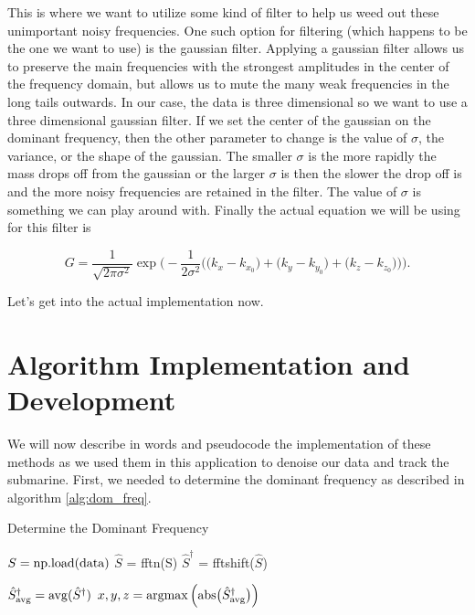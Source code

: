 \documentclass[11pt]{amsart}
\begin{document}
This is where we want to utilize some kind of filter to help us weed out these unimportant noisy frequencies.
One such option for filtering (which happens to be the one we want to use) is the gaussian filter.
Applying a gaussian filter allows us to preserve the main frequencies with the strongest amplitudes in the center of the frequency domain, but allows us to mute the many weak frequencies in the long tails outwards.
In our case, the data is three dimensional so we want to use a three dimensional gaussian filter.
If we set the center of the gaussian on the dominant frequency, then the other parameter to change is the value of $\sigma$, the variance, or the shape of the gaussian.
The smaller $\sigma$ is the more rapidly the mass drops off from the gaussian or the larger $\sigma$ is then the slower the drop off is and the more noisy frequencies are retained in the filter.
The value of $\sigma$ is something we can play around with.
Finally the actual equation we will be using for this filter is

\begin{equation}
G = \frac {1}{\sqrt{2 \pi \sigma^2}}\exp \Bigg( - \frac{1}{2 \sigma^2 } \Big( \big(k_x - k_{x_0}\big) + \big(k_y - k_{y_0}\big) + \big(k_z - k_{z_0}\big) \Big) \Bigg).
\label{eq:guassian}
\end{equation}

Let's get into the actual implementation now.

\section{Algorithm Implementation and Development}\label{sec:algorithms}
We will now describe in words and pseudocode the implementation of these methods as we used them in this application to denoise our data and track the submarine.
First, we needed to determine the dominant frequency as described in algorithm \ref{alg:dom_freq}.

\begin{algorithm}
\caption{Determine the Dominant Frequency}\label{alg:dom_freq}
\begin{algorithmic}
\State $ S = {\rm np.load(data)}$ 
\State $\hat S$ = fftn(S)
\State $\hat S^\dag$ = fftshift($\hat S$) 

\State $\hat S^\dag_{\rm avg} = {\rm avg}(\hat S^\dag)$ 
\State $x, y, z = {\rm argmax} \left( {\rm abs} \big( \hat S^\dag_{\rm avg} \big) \right) $ 
\end{algorithmic}
\end{algorithm}
\end{document}
